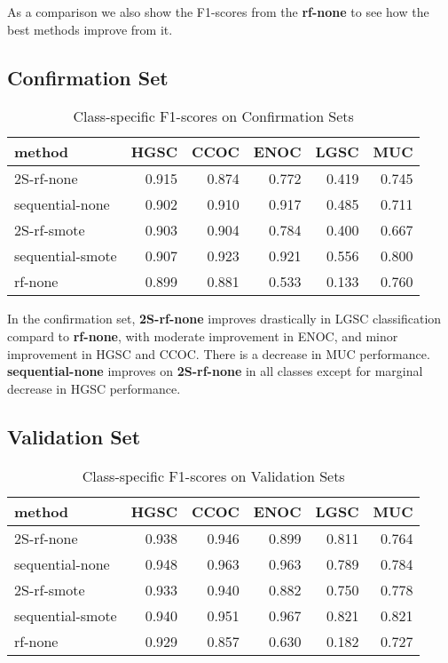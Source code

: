 \documentclass[
]{report}
\begin{document}
As a comparison we also show the F1-scores from the \textbf{rf-none} to see how the best methods improve from it.

\hypertarget{confirmation-set}{%
\subsection{Confirmation Set}\label{confirmation-set}}

\begin{table}

\caption{\label{tab:confirmation-set}Class-specific F1-scores on Confirmation Sets}
\centering
\begin{tabular}[t]{l|r|r|r|r|r}
\hline
method & HGSC & CCOC & ENOC & LGSC & MUC\\
\hline
2S-rf-none & 0.915 & 0.874 & 0.772 & 0.419 & 0.745\\
\hline
sequential-none & 0.902 & 0.910 & 0.917 & 0.485 & 0.711\\
\hline
2S-rf-smote & 0.903 & 0.904 & 0.784 & 0.400 & 0.667\\
\hline
sequential-smote & 0.907 & 0.923 & 0.921 & 0.556 & 0.800\\
\hline
rf-none & 0.899 & 0.881 & 0.533 & 0.133 & 0.760\\
\hline
\end{tabular}
\end{table}

In the confirmation set, \textbf{2S-rf-none} improves drastically in LGSC classification compard to \textbf{rf-none}, with moderate improvement in ENOC, and minor improvement in HGSC and CCOC. There is a decrease in MUC performance. \textbf{sequential-none} improves on \textbf{2S-rf-none} in all classes except for marginal decrease in HGSC performance.

\hypertarget{validation-set}{%
\subsection{Validation Set}\label{validation-set}}

\begin{table}

\caption{\label{tab:validation-set}Class-specific F1-scores on Validation Sets}
\centering
\begin{tabular}[t]{l|r|r|r|r|r}
\hline
method & HGSC & CCOC & ENOC & LGSC & MUC\\
\hline
2S-rf-none & 0.938 & 0.946 & 0.899 & 0.811 & 0.764\\
\hline
sequential-none & 0.948 & 0.963 & 0.963 & 0.789 & 0.784\\
\hline
2S-rf-smote & 0.933 & 0.940 & 0.882 & 0.750 & 0.778\\
\hline
sequential-smote & 0.940 & 0.951 & 0.967 & 0.821 & 0.821\\
\hline
rf-none & 0.929 & 0.857 & 0.630 & 0.182 & 0.727\\
\hline
\end{tabular}
\end{table}
\end{document}

